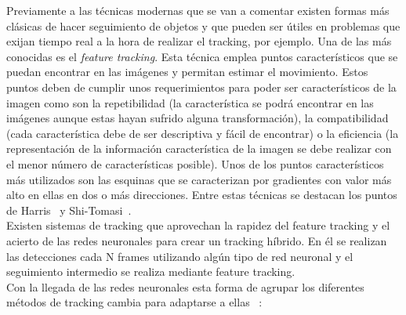 \documentclass{bmvc2k}
\begin{document}
Previamente a las técnicas modernas que se van a comentar existen formas más clásicas de hacer seguimiento de objetos y que pueden ser útiles en problemas que exijan tiempo real a la hora de realizar el tracking, por ejemplo. Una de las más conocidas es el \textit{feature tracking}. Esta técnica emplea puntos característicos que se puedan encontrar en las imágenes y permitan estimar el movimiento. Estos puntos deben de cumplir unos requerimientos para poder ser característicos de la imagen como son la repetibilidad (la característica se podrá encontrar en las imágenes aunque estas hayan sufrido alguna transformación), la compatibilidad (cada característica debe de ser descriptiva y fácil de encontrar) o la eficiencia (la representación de la información característica de la imagen se debe realizar con el menor número de características posible). Unos de los puntos característicos más utilizados son las esquinas que se caracterizan por gradientes con valor más alto en ellas en dos o más direcciones. Entre estas técnicas se destacan los puntos de Harris~\cite{harris1988combined} y Shi-Tomasi~\cite{shi1994good}.\\
Existen sistemas de tracking que aprovechan la rapidez del feature tracking y el acierto de las redes neuronales para crear un tracking híbrido. En él se realizan las detecciones cada N frames utilizando algún tipo de red neuronal y el seguimiento intermedio se realiza mediante feature tracking.\\
Con la llegada de las redes neuronales esta forma de agrupar los diferentes métodos de tracking cambia para adaptarse a ellas ~\cite{held2016learning}:
\end{document}
